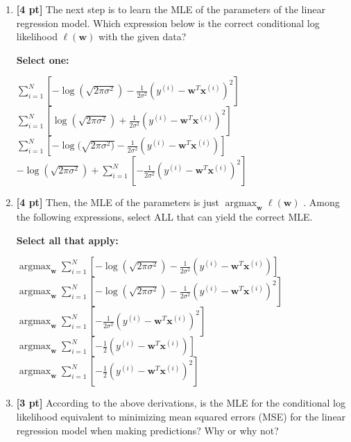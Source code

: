 \documentclass[11pt,addpoints,answers]{exam}
\newcommand{\argmax}{\mathop{\mathrm{argmax}}}
\begin{document}
\begin{enumerate}
    
    \item \textbf{[4 pt]} The next step is to learn the MLE of the parameters of the linear regression model. Which expression below is the correct conditional log likelihood $\ell(\mathbf{w})$ with the given data?

    \textbf{Select one:}
    \begin{checkboxes}
        \choice $\sum_{i=1}^{N} [-\log (\sqrt{2\pi\sigma^2}) - \frac{1}{2\sigma^2} (y^{(i)} - \mathbf{w}^T\mathbf{x}^{(i)})^2]$
        \choice $\sum_{i=1}^{N} [\log (\sqrt{2\pi\sigma^2}) + \frac{1}{2\sigma^2} (y^{(i)} - \mathbf{w}^T\mathbf{x}^{(i)})^2]$
        \choice $\sum_{i=1}^{N} [-\log(\sqrt{2\pi\sigma^2)} - \frac{1}{2\sigma^2} (y^{(i)} - \mathbf{w}^T\mathbf{x}^{(i)})]$
        \choice $-\log (\sqrt{2\pi\sigma^2}) + \sum_{i=1}^{N} [-\frac{1}{2\sigma^2} (y^{(i)} - \mathbf{w}^T\mathbf{x}^{(i)})^2]$
    \end{checkboxes}
    
    
    \item \textbf{[4 pt]} Then, the MLE of the parameters is just  $\argmax_{\mathbf{w}} \ell(\mathbf{w})$ . Among the following expressions, select ALL that can yield the correct MLE. 

    \textbf{Select all that apply:}
    {\checkboxchar{$\Box$} \checkedchar{$\blacksquare$}
    \begin{checkboxes}
        \choice $\argmax_{\mathbf{w}} \sum_{i=1}^{N} [-\log (\sqrt{2\pi\sigma^2}) - \frac{1}{2\sigma^2} (y^{(i)} - \mathbf{w}^T\mathbf{x}^{(i)})]$
        \choice $\argmax_{\mathbf{w}} \sum_{i=1}^{N} [-\log (\sqrt{2\pi\sigma^2}) - \frac{1}{2\sigma^2} (y^{(i)} - \mathbf{w}^T\mathbf{x}^{(i)})^2]$
        \choice $\argmax_{\mathbf{w}} \sum_{i=1}^{N} [- \frac{1}{2\sigma^2} (y^{(i)} - \mathbf{w}^T\mathbf{x}^{(i)})^2]$
        \choice $\argmax_{\mathbf{w}} \sum_{i=1}^{N} [- \frac{1}{2} (y^{(i)} - \mathbf{w}^T\mathbf{x}^{(i)})]$
        \choice $\argmax_{\mathbf{w}} \sum_{i=1}^{N} [- \frac{1}{2} (y^{(i)} - \mathbf{w}^T\mathbf{x}^{(i)})^2]$
    \end{checkboxes}
    }
    
    \clearpage
    
    \item \textbf{[3 pt]} According to the above derivations, is the MLE for the conditional log likelihood equivalent to minimizing mean squared errors (MSE) for the linear regression model when making predictions? Why or why not? 


\end{enumerate}
\end{document}

